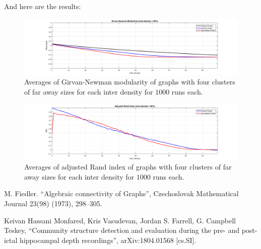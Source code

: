 \documentclass{amsart}
\begin{document}
			And here are the results:
			
			\begin{figure}[h]
			\begin{center}
				\includegraphics[width = \linewidth, trim = 70 0 70 10, clip]{four_faraway_clusters_modularity}
				\caption{Averages of Girvan-Newman modularity of graphs with four clusters of far away sizes for each inter density for $1000$ runs each.}
				\label{four_faraway_clusters_GNM}
			\end{center}
			\end{figure}
		
			\begin{figure}[h]
			\begin{center}
				\includegraphics[width = \linewidth, trim = 70 0 70 10, clip]{four_faraway_clusters_ari}
				\caption{Averages of adjusted Rand index of graphs with four clusters of far away sizes for each inter density for $1000$ runs each.}
				\label{four_faraway_clusters_ARI}
			\end{center}
			\end{figure}
			
\begin{thebibliography}{9}
	 M. Fiedler. ``Algebraic connectivity of Graphs'', Czechoslovak Mathematical Journal 23(98) (1973), 298--305.
	
	 Keivan Hassani Monfared, Kris Vasudevan, Jordan S. Farrell, G. Campbell Teskey, ``Community structure detection and evaluation during the pre- and post-ictal hippocampal depth recordings'',	arXiv:1804.01568 [cs.SI].
\end{thebibliography}
\end{document}
